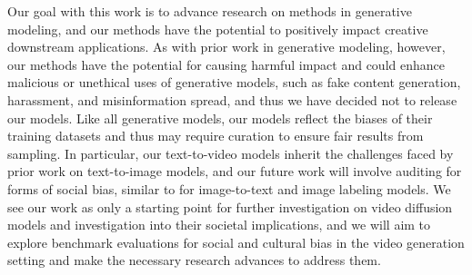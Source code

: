 Our goal with this work is to advance research on methods in generative modeling, and our methods have the potential to positively impact creative downstream applications. As with prior work in generative modeling, however, our methods have the potential for causing harmful impact and could enhance  malicious or unethical uses of generative models, such as fake content generation, harassment, and  misinformation spread, and thus we have decided not to release our models. Like all generative models, our models reflect the biases of their training datasets and thus may require curation to ensure fair results from sampling. In particular, our text-to-video models inherit the challenges faced by prior work on text-to-image models, and our future work will involve auditing for forms of social bias, similar to \cite{gendershades, Burns2018, Steed2021, dalleval} for image-to-text and image labeling models. We see our work as only a starting point for further investigation on video diffusion models and investigation into their societal implications, and we will aim to explore benchmark evaluations for social and cultural bias in the video generation setting and make the necessary research advances to address them.

\FloatBarrier


